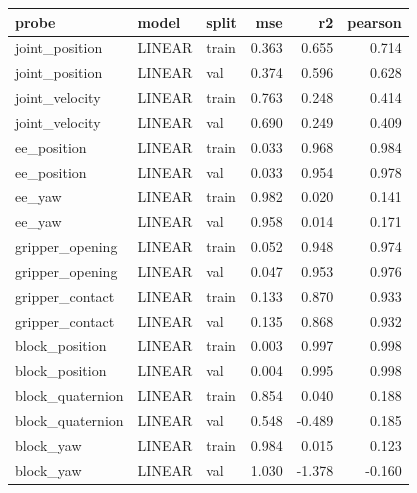\begin{tabular}{lllrrr}
\toprule
probe & model & split & mse & r2 & pearson \\
\midrule
joint_position & LINEAR & train & 0.363 & 0.655 & 0.714 \\
joint_position & LINEAR & val & 0.374 & 0.596 & 0.628 \\
joint_velocity & LINEAR & train & 0.763 & 0.248 & 0.414 \\
joint_velocity & LINEAR & val & 0.690 & 0.249 & 0.409 \\
ee_position & LINEAR & train & 0.033 & 0.968 & 0.984 \\
ee_position & LINEAR & val & 0.033 & 0.954 & 0.978 \\
ee_yaw & LINEAR & train & 0.982 & 0.020 & 0.141 \\
ee_yaw & LINEAR & val & 0.958 & 0.014 & 0.171 \\
gripper_opening & LINEAR & train & 0.052 & 0.948 & 0.974 \\
gripper_opening & LINEAR & val & 0.047 & 0.953 & 0.976 \\
gripper_contact & LINEAR & train & 0.133 & 0.870 & 0.933 \\
gripper_contact & LINEAR & val & 0.135 & 0.868 & 0.932 \\
block_position & LINEAR & train & 0.003 & 0.997 & 0.998 \\
block_position & LINEAR & val & 0.004 & 0.995 & 0.998 \\
block_quaternion & LINEAR & train & 0.854 & 0.040 & 0.188 \\
block_quaternion & LINEAR & val & 0.548 & -0.489 & 0.185 \\
block_yaw & LINEAR & train & 0.984 & 0.015 & 0.123 \\
block_yaw & LINEAR & val & 1.030 & -1.378 & -0.160 \\
\bottomrule
\end{tabular}
